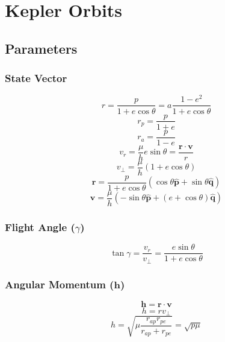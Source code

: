 \section{Kepler Orbits}

\subsection{Parameters}

\subsubsection{State Vector}
\begin{equation}
    r = \frac{p}{1+e\cos{\theta}} = a\frac{1-e^2}{1+e\cos{\theta}}
\end{equation}
\begin{equation}
    r_{p} = \frac{p}{1+e}
\end{equation}
\begin{equation}
    r_{a} = \frac{p}{1-e}
\end{equation}
\begin{equation}
    v_r = \frac{\mu}{h}e\sin{\theta} = \frac{\mathbf{r}\cdot\mathbf{v}}{r}
\end{equation}
\begin{equation}
    v_{\bot} = \frac{\mu}{h}\left(1+e\cos{\theta}\right)
\end{equation}
\begin{equation}
    \mathbf{r} = \frac{p}{1+e\cos{\theta}}\left(\cos{\theta}\hat{\mathbf{p}} + \sin{\theta}\hat{\mathbf{q}}\right)
\end{equation}
\begin{equation}
    \mathbf{v} = \frac{\mu}{h}\left(-\sin{\theta}\hat{\mathbf{p}} + \left(e+\cos{\theta}\right)\hat{\mathbf{q}}\right)
\end{equation}


\subsubsection{Flight Angle ($\gamma$)}
\begin{equation}
    \tan{\gamma}=\frac{v_r}{v_{\bot}}=\frac{e\sin{\theta}}{1+e\cos{\theta}}
\end{equation}


\subsubsection{Angular Momentum ($\mathbf{h}$)}
\begin{equation}
    \mathbf{h} = \mathbf{r} \cdot \mathbf{v}
\end{equation}
\begin{equation}
    h = rv_{\bot}
\end{equation}
\begin{equation}
    h = \sqrt{\mu\frac{r_{ap}r_{pe}}{r_{ap}+r_{pe}}} = \sqrt{p\mu}
\end{equation}

